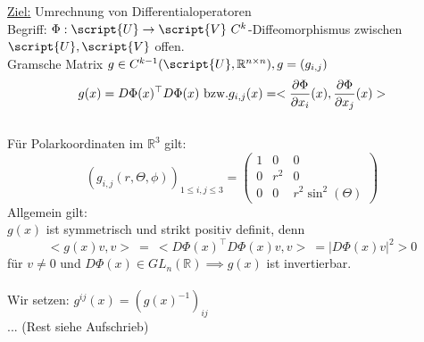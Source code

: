   \begin{remark}
    \underline{Ziel:} Umrechnung von Differentialoperatoren\\
    Begriff: $\Phi: \script{U} \to \script{V} \ C^k$-Diffeomorphismus zwischen $\script{U}, \script{V}$ offen.\\
    Gramsche Matrix $g \in C^{k-1}(\script{U}, \mathbb{R}^{n\times n}), g = (g_{i,j})$
    $$g(x) = D\Phi(x)^{\top} D\Phi(x) \text{ bzw.}\\
    g_{i,j}(x) = <\frac{\partial\Phi}{\partial x_i}(x), \frac{\partial\Phi}{\partial x_j}(x)>$$\\
    Für Polarkoordinaten im $\mathbb{R}^3$ gilt:
    $$(g_{i,j}(r, \Theta, \phi))_{1\leq i,j \leq 3} = \left(\begin{array}{ccc}
      1 & 0 & 0 \\
      0 & r^2 & 0 \\
      0 & 0 & r^2 \sin^2(\Theta)      
    \end{array}\right)$$
    Allgemein gilt:\\
    $g(x)$ ist symmetrisch und strikt positiv definit, denn
    $$<g(x)v,v> \ = \ <D\Phi(x)^{\top}D\Phi(x) v, v> \ = |D\Phi(x) v|^2 > 0$$
    für $v\neq 0$ und $D\Phi(x) \in GL_n(\mathbb{R}) \implies g(x)$ ist invertierbar.\\
    \\
    Wir setzen: $g^{ij}(x) = (g(x)^{-1})_{ij}$\\
    ... (Rest siehe Aufschrieb)
  \end{remark}

